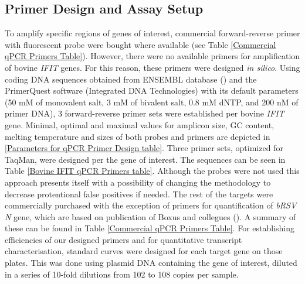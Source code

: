 \subsection{Primer Design and Assay Setup} \label{Primer Design and Assay Setup}
To amplify specific regions of genes of interest, commercial forward-reverse primer with fluorescent probe were bought where available (see Table \ref{Commercial qPCR Primers Table}). However, there were no available primers for amplification of bovine \textit{IFIT} genes. For this reason, these primers were designed \textit{in silico}. Using coding DNA sequences obtained from ENSEMBL database (\cite{Cunningham2022Ensembl2022}) and the PrimerQuest software (Integrated DNA Technologies) with its default parameters (50 mM of monovalent salt, 3 mM of bivalent salt, 0.8 mM dNTP, and 200 nM of primer DNA), 3 forward-reverse primer sets were established per bovine \textit{IFIT} gene. Minimal, optimal and maximal values for amplicon size, GC content, melting temperature and sizes of both probes and primers are depicted in \ref{Parameters for qPCR Primer Design table}. Three primer sets, optimized for TaqMan, were designed per the gene of interest. The sequences can be seen in Table \ref{Bovine IFIT qPCR Primers table}. Although the probes were not used this approach presents itself with a possibility of changing the methodology to decrease protentional false positives if needed. The rest of the targets were commercially purchased with the exception of primers for quantification of \textit{bRSV N} gene, which are based on publication of Boxus and collegues (\cite{Boxus2005RealVirus}). A summary of these can be found in Table \ref{Commercial qPCR Primers Table}. For establishing efficiencies of our designed primers and for quantitative transcript characterisation, standard curves were designed for each target gene on those plates. This was done using plasmid DNA containing the gene of interest, diluted in a series of 10-fold dilutions from 102 to 108 copies per sample.

